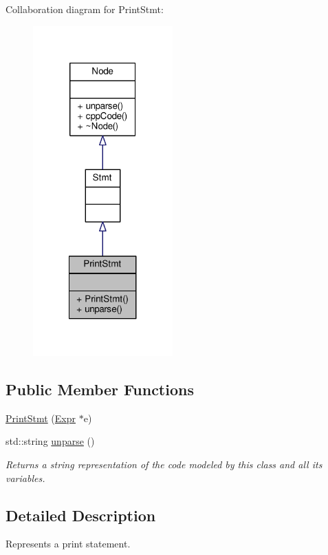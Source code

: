 Collaboration diagram for Print\-Stmt\-:\nopagebreak
\begin{figure}[H]
\begin{center}
\leavevmode
\includegraphics[width=152pt]{classPrintStmt__coll__graph}
\end{center}
\end{figure}
\subsection*{Public Member Functions}
\begin{DoxyCompactItemize}
\item 
\hyperlink{classPrintStmt_a58af5b7c49ef63dfa35950ac253f81ca}{Print\-Stmt} (\hyperlink{classExpr}{Expr} $\ast$e)
\item 
std\-::string \hyperlink{classPrintStmt_a7f80dc4ce628e16d32cb6f06a417a748}{unparse} ()
\begin{DoxyCompactList}\small\item\em Returns a string representation of the code modeled by this class and all its variables. \end{DoxyCompactList}\end{DoxyCompactItemize}


\subsection{Detailed Description}
Represents a print statement. \par
 

